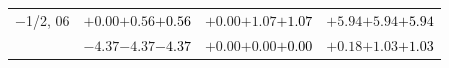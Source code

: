 \documentclass[compress]{beamer}
\begin{document}
\begin{frame}
\begin{tabular}{r | c | c | c}
$-$1/2, 06 & $+0.00$\hspace{0.1 cm}$+0.56$\hspace{0.1 cm}\textcolor{black}{$+0.56$} & $+0.00$\hspace{0.1 cm}$+1.07$\hspace{0.1 cm}\textcolor{black}{$+1.07$} & $+5.94$\hspace{0.1 cm}$+5.94$\hspace{0.1 cm}\textcolor{black}{$+5.94$} \\
           & $-4.37$\hspace{0.1 cm}$-4.37$\hspace{0.1 cm}\textcolor{black}{$-4.37$} & $+0.00$\hspace{0.1 cm}$+0.00$\hspace{0.1 cm}\textcolor{black}{$+0.00$} & $+0.18$\hspace{0.1 cm}$+1.03$\hspace{0.1 cm}\textcolor{black}{$+1.03$} \\
\end{tabular}
\end{frame}
\end{document}
